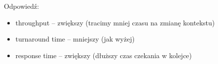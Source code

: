 Odpowiedź:
\begin{itemize}
	\item throughput -- zwiększy (tracimy mniej czasu na zmianę kontekstu)
	\item turnaround time -- mniejszy (jak wyżej)
	\item response time -- zwiększy (dłuższy czas czekania w kolejce)
\end{itemize}
